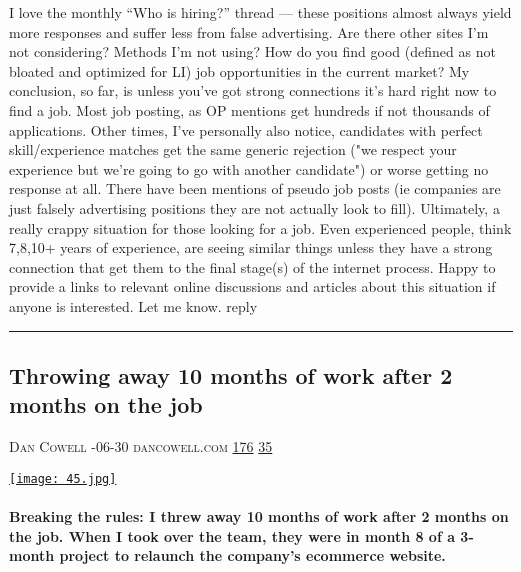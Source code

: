 \documentclass[10pt,a4paper]{article}
\begin{document}
\begin{multicols}{2}
I love the monthly “Who is hiring?” thread — these positions almost always yield more responses and suffer less from false advertising.
Are there other sites I’m not considering? Methods I’m not using? How do you find good (defined as not bloated and optimized for LI) job opportunities in the current market?
My conclusion, so far, is unless you've got strong connections it's hard right now to find a job. Most job posting, as OP mentions get hundreds if not thousands of applications. Other times, I've personally also notice, candidates with perfect skill/experience matches get the same generic rejection ("we respect your experience but we're going to go with another candidate") or worse getting no response at all. There have been mentions of pseudo job posts (ie companies are just falsely advertising positions they are not actually look to fill). Ultimately, a really crappy situation for those looking for a job. Even experienced people, think 7,8,10+ years of experience, are seeing similar things unless they have a strong connection that get them to the final stage(s) of the internet process.
Happy to provide a links to relevant online discussions and articles about this situation if anyone is interested. Let me know.
reply
\par\noindent\textcolor{red}{\rule{\linewidth}{0.2mm}}
\vfill
\null
\noindent\begin{minipage}{\linewidth}
\subsection{Throwing away 10 months of work after 2 months on the job}
\textsc{\footnotesize
{\scriptsize\faUser}\space 
Dan Cowell 
{\scriptsize\faCalendar}-06-30 
{\scriptsize\faGlobe}\space 
dancowell.com 
{\scriptsize\faThumbsOUp}\space 
\href{http://news.ycombinator.com/item?id=37167833\&utm\_term=comment}{176} 
{\scriptsize\faComments}\space 
\href{http://news.ycombinator.com/item?id=37167833\&utm\_term=comment}{35} 
}
\par\medskip\noindent
\href{https://www.dancowell.com/breaking-the-rules/?utm\_source=hackernewsletter\&utm\_medium=email\&utm\_term=working}{
    \texttt{[image: 45.jpg]}
}
\end{minipage}
\paragraph{}
\textbf{Breaking the rules: I threw away 10 months of work after 2 months on the job.
When I took over the team, they were in month 8 of a 3-month project to relaunch the company's ecommerce website.}

\end{multicols}
\end{document}
